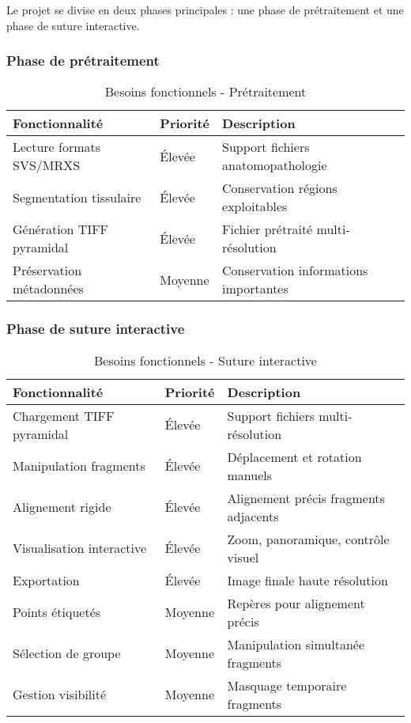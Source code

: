 \documentclass[12pt,a4paper]{report}
\begin{document}
Le projet se divise en deux phases principales : une phase de prétraitement et une phase de suture interactive.

\subsubsection{Phase de prétraitement}

\begin{table}[h!]
\centering
\footnotesize
\begin{tabular}{|p{4cm}|p{1.5cm}|p{7cm}|}
\hline
\rowcolor{LightGray}
\textbf{Fonctionnalité} & \textbf{Priorité} & \textbf{Description} \\
\hline
Lecture formats SVS/MRXS & Élevée & Support fichiers anatomopathologie \\
\hline
Segmentation tissulaire & Élevée & Conservation régions exploitables \\
\hline
Génération TIFF pyramidal & Élevée & Fichier prétraité multi-résolution \\
\hline
Préservation métadonnées & Moyenne & Conservation informations importantes \\
\hline
\end{tabular}
\caption{Besoins fonctionnels - Prétraitement}
\end{table}

\subsubsection{Phase de suture interactive}

\begin{table}[h!]
\centering
\footnotesize
\begin{tabular}{|p{4cm}|p{1.5cm}|p{7cm}|}
\hline
\rowcolor{LightGray}
\textbf{Fonctionnalité} & \textbf{Priorité} & \textbf{Description} \\
\hline
Chargement TIFF pyramidal & Élevée & Support fichiers multi-résolution \\
\hline
Manipulation fragments & Élevée & Déplacement et rotation manuels \\
\hline
Alignement rigide & Élevée & Alignement précis fragments adjacents \\
\hline
Visualisation interactive & Élevée & Zoom, panoramique, contrôle visuel \\
\hline
Exportation & Élevée & Image finale haute résolution \\
\hline
Points étiquetés & Moyenne & Repères pour alignement précis \\
\hline
Sélection de groupe & Moyenne & Manipulation simultanée fragments \\
\hline
Gestion visibilité & Moyenne & Masquage temporaire fragments \\
\hline
\end{tabular}
\caption{Besoins fonctionnels - Suture interactive}
\end{table}
\end{document}
